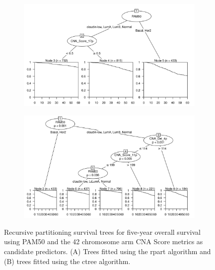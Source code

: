 \begin{figure}[!htb]
\centering

\vspace{0.5cm}

\begin{subfigure}{\textwidth}
\subcaption{}
\includegraphics[width=1\textwidth]{../figures/Appendices/Appendix_B/PA_PartyKit_Survival_Score_FiveYearOS_PAM50.png}
\end{subfigure}

\vspace{2cm}

\begin{subfigure}{\textwidth}
\subcaption{}
\includegraphics[width=1\textwidth]{../figures/Appendices/Appendix_B/PA_Ctree_Survival_Score_FiveYearOS_PAM50.png}
\end{subfigure}

\vspace{0.5cm}

\caption[Recursive partitioning survival trees for five-year overall survival using PAM50 and the 42 chromosome arm CNA Score metrics as candidate predictors.]{Recursive partitioning survival trees for five-year overall survival using PAM50 and the 42 chromosome arm CNA Score metrics as candidate predictors. (A) Trees fitted using the rpart algorithm and (B) trees fitted using the ctree algorithm.}
\end{figure}


